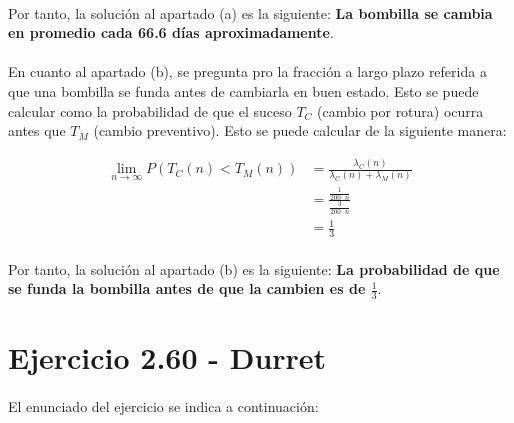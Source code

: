 \documentclass[a4paper, spanish]{article}
\begin{document}
  \paragraph{}
  Por tanto, la solución al apartado (a) es la siguiente: \textbf{La bombilla se cambia en promedio cada 66.6 días aproximadamente}.

  \paragraph{}
  En cuanto al apartado (b), se pregunta pro la fracción a largo plazo referida a que una bombilla se funda antes de cambiarla en buen estado. Esto se puede calcular como la probabilidad de que el suceso $T_C$ (cambio por rotura) ocurra antes que $T_M$ (cambio preventivo). Esto se puede calcular de la siguiente manera:

  \begin{align*}
    \lim_{n\to\infty} P(T_C(n) < T_M(n))
    &= \frac{\lambda_C(n)}{\lambda_C(n) + \lambda_M(n)} \\
    &= \frac{\frac{1}{200 \cdot n}}{\frac{3}{200 \cdot n}}\\
    &= \frac{1}{3}
  \end{align*}

  \paragraph{}
  Por tanto, la solución al apartado (b) es la siguiente: \textbf{La probabilidad de que se funda la bombilla antes de que la cambien es de $\frac{1}{3}$}.


  \section{Ejercicio 2.60 - Durret}

    \paragraph{}
    El enunciado del ejercicio se indica a continuación:

    \begin{displayquote}
    \end{displayquote}
\end{document}
